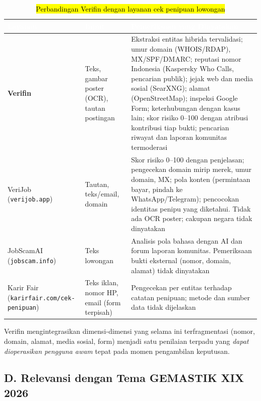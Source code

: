 \documentclass[12pt,a4paper]{article}
\newcommand{\revisi}[1]{\hl{#1}}
\newcommand{\thead}[1]{\textcolor{white}{\textbf{#1}}}
\begin{document}
\begin{table}[H]
\centering
\caption{\revisi{Perbandingan Verifin dengan layanan cek penipuan lowongan}}
\label{tab:perbandingan}
\small
\begin{tabularx}{\linewidth}{|L{2.2cm}|L{3.0cm}|Y|}
\hline
{}\thead{Layanan} & \thead{Input} & \thead{Pemeriksaan yang Dinyatakan} \\
\hline
{}\textbf{Verifin} & Teks, gambar poster (OCR), tautan postingan & Ekstraksi entitas hibrida tervalidasi; umur domain (WHOIS/RDAP), MX/SPF/DMARC; reputasi nomor Indonesia (Kaspersky Who Calls, pencarian publik); jejak web dan media sosial (SearXNG); alamat (OpenStreetMap); inspeksi Google Form; keterhubungan dengan kasus lain; skor risiko 0--100 dengan atribusi kontribusi tiap bukti; pencarian riwayat dan laporan komunitas termoderasi \\ \hline
{}VeriJob (\texttt{verijob.app}) & Tautan, teks/email, domain & Skor risiko 0--100 dengan penjelasan; pengecekan domain mirip merek, umur domain, MX; pola konten (permintaan bayar, pindah ke WhatsApp/Telegram); pencocokan identitas penipu yang diketahui. Tidak ada OCR poster; cakupan negara tidak dinyatakan \\ \hline
{}JobScamAI (\texttt{jobscam.info}) & Teks lowongan & Analisis pola bahasa dengan AI dan forum laporan komunitas. Pemeriksaan bukti eksternal (nomor, domain, alamat) tidak dinyatakan \\ \hline
{}Karir Fair (\texttt{karirfair.com/cek-penipuan}) & Teks iklan, nomor HP, email (form terpisah) & Pengecekan per entitas terhadap catatan penipuan; metode dan sumber data tidak dijelaskan \\ \hline
\end{tabularx}
\end{table}

Verifin mengintegrasikan dimensi-dimensi yang selama ini terfragmentasi (nomor, domain, alamat, media
sosial, form) menjadi satu penilaian terpadu yang \emph{dapat dioperasikan pengguna awam} tepat
pada momen pengambilan keputusan.

\vspace{0.1cm}
\subsection*{D. Relevansi dengan Tema GEMASTIK XIX 2026}
\end{document}
